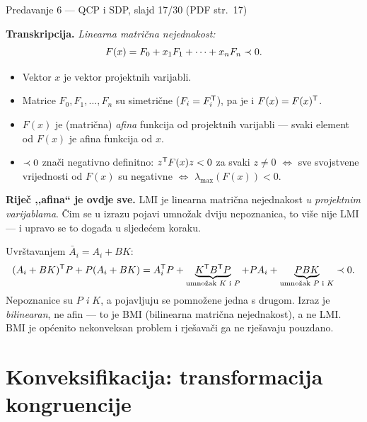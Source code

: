 \begin{izvor}{Predavanje 6 --- QCP i SDP, slajd 17/30 (PDF str.~17)}

\textbf{Transkripcija.} \emph{Linearna matrična nejednakost:}
\[
F(x) = F_0 + x_1F_1 + \dots + x_nF_n \prec 0 .
\]
\begin{itemize}[nosep,leftmargin=*]
  \item Vektor $x$ je vektor projektnih varijabli.
  \item Matrice $F_0, F_1, \dots, F_n$ su simetrične ($F_i = F_i^{\mathsf{T}}$), pa je i
        $F(x) = F(x)^{\mathsf{T}}$.
  \item $F(x)$ je (matrična) \emph{afina} funkcija od projektnih varijabli ---
        svaki element od $F(x)$ je afina funkcija od $x$.
  \item $\prec 0$ znači negativno definitno: $z^{\mathsf{T}} F(x) z < 0$ za svaki $z \neq 0$
        $\Leftrightarrow$ sve svojstvene vrijednosti od $F(x)$ su negativne
        $\Leftrightarrow$ $\lambda_{\max}(F(x)) < 0$.
\end{itemize}

\textbf{Riječ ,,afina`` je ovdje sve.} LMI je linearna matrična nejednakost
\emph{u projektnim varijablama}. Čim se u izrazu pojavi umnožak dviju
nepoznanica, to više nije LMI --- i upravo se to događa u sljedećem koraku.
\end{izvor}

\begin{korak}
Uvrštavanjem $\bar{A}_i = A_i + BK$:
\begin{equation}
(A_i + BK)^{\mathsf{T}} P + P(A_i + BK)
= A_i^{\mathsf{T}} P + \underbrace{K^{\mathsf{T}} B^{\mathsf{T}} P}_{\text{umnožak } K \text{ i } P}
+ PA_i + \underbrace{PBK}_{\text{umnožak } P \text{ i } K} \prec 0 .
\end{equation}
Nepoznanice su $P$ \emph{i} $K$, a pojavljuju se pomnožene jedna s drugom. Izraz
je \emph{bilinearan}, ne afin --- to je BMI (bilinearna matrična nejednakost), a
ne LMI. BMI je općenito nekonveksan problem i rješavači ga ne rješavaju
pouzdano.
\end{korak}

\section{Konveksifikacija: transformacija kongruencije}
\label{sec:z4-kongruencija}

